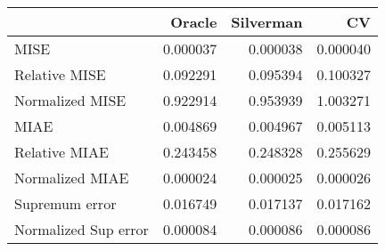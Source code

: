 \begin{tabular}{lrrr}
  \toprule
 & Oracle & Silverman & CV \\ 
  \midrule
MISE & 0.000037 & 0.000038 & 0.000040 \\ 
  Relative MISE & 0.092291 & 0.095394 & 0.100327 \\ 
  Normalized MISE & 0.922914 & 0.953939 & 1.003271 \\ 
  MIAE & 0.004869 & 0.004967 & 0.005113 \\ 
  Relative MIAE & 0.243458 & 0.248328 & 0.255629 \\ 
  Normalized MIAE & 0.000024 & 0.000025 & 0.000026 \\ 
  Supremum error & 0.016749 & 0.017137 & 0.017162 \\ 
  Normalized Sup error & 0.000084 & 0.000086 & 0.000086 \\ 
   \bottomrule
\end{tabular}
